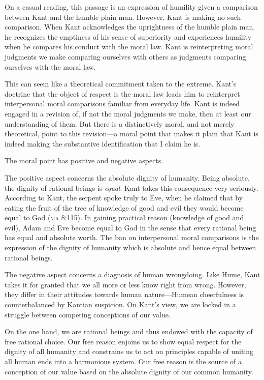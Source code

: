 \documentclass[12pt]{article}
\begin{document}
On a casual reading, this passage is an expression of humility given a comparison between Kant and the humble plain man. However, Kant is making no such comparison. When Kant acknowledges the uprightness of the humble plain man, he recognizes the emptiness of his sense of superiority and experiences humility when he compares his conduct with the moral law. Kant is reinterpreting moral judgments we make comparing ourselves with others as judgments comparing ourselves with the moral law.

This can seem like a theoretical commitment taken to the extreme. Kant's doctrine that the object of respect is the moral law leads him to reinterpret interpersonal moral comparisons familiar from everyday life. Kant is indeed engaged in a revision of, if not the moral judgments we make, then at least our understanding of them. But there is a distinctively moral, and not merely theoretical, point to this revision---a moral point that makes it plain that Kant is indeed making the substantive identification that I claim he is.

The moral point has positive and negative aspects.

The positive aspect concerns the absolute dignity of humanity. Being absolute, the dignity of rational beings is \emph{equal}. Kant takes this consequence very seriously. According to Kant, the serpent spoke truly to Eve, when he claimed that by eating the fruit of the tree of knowledge of good and evil they would become equal to God (\textsc{ma} 8:115). In gaining practical reason (knowledge of good and evil), Adam and Eve become equal to God in the sense that every rational being has equal and absolute worth. The ban on interpersonal moral comparisons is the expression of the dignity of humanity which is absolute and hence equal between rational beings.

The negative aspect concerns a diagnosis of human wrongdoing. Like Hume, Kant takes it for granted that we all more or less know right from wrong. However, they differ in their attitudes towards human nature---Humean cheerfulness is counterbalanced by Kantian suspicion. On Kant's view, we are locked in a struggle between competing conceptions of our value. 

On the one hand, we are rational beings and thus endowed with the capacity of free rational choice. Our free reason enjoins us to show equal respect for the dignity of all humanity and constrains us to act on principles capable of uniting all human ends into a harmonious system. Our free reason is the source of a conception of our value based on the absolute dignity of our common humanity. 
\end{document}
